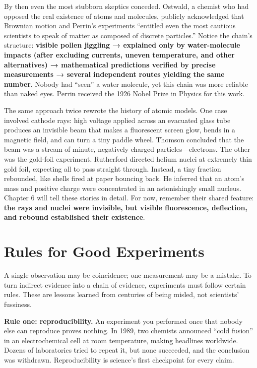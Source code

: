 \begin{zhengju}
By then even the most stubborn skeptics conceded. Ostwald, a chemist who had opposed the real existence of atoms and molecules, publicly acknowledged that Brownian motion and Perrin's experiments ``entitled even the most cautious scientists to speak of matter as composed of discrete particles.'' Notice the chain's structure: \textbf{visible pollen jiggling → explained only by water-molecule impacts (after excluding currents, uneven temperature, and other alternatives) → mathematical predictions verified by precise measurements → several independent routes yielding the same number}. Nobody had ``seen'' a water molecule, yet this chain was more reliable than naked eyes. Perrin received the 1926 Nobel Prize in Physics for this work.
\end{zhengju}

The same approach twice rewrote the history of atomic models. One case involved cathode rays: high voltage applied across an evacuated glass tube produces an invisible beam that makes a fluorescent screen glow, bends in a magnetic field, and can turn a tiny paddle wheel. Thomson concluded that the beam was a stream of minute, negatively charged particles---electrons. The other was the gold-foil experiment. Rutherford directed helium nuclei at extremely thin gold foil, expecting all to pass straight through. Instead, a tiny fraction rebounded, like shells fired at paper bouncing back. He inferred that an atom's mass and positive charge were concentrated in an astonishingly small nucleus. Chapter 6 will tell these stories in detail. For now, remember their shared feature: \textbf{the rays and nuclei were invisible, but visible fluorescence, deflection, and rebound established their existence}.

\section{Rules for Good Experiments}

A single observation may be coincidence; one measurement may be a mistake. To turn indirect evidence into a chain of evidence, experiments must follow certain rules. These are lessons learned from centuries of being misled, not scientists' fussiness.

\textbf{Rule one: reproducibility.} An experiment you performed once that nobody else can reproduce proves nothing. In 1989, two chemists announced ``cold fusion'' in an electrochemical cell at room temperature, making headlines worldwide. Dozens of laboratories tried to repeat it, but none succeeded, and the conclusion was withdrawn. Reproducibility is science's first checkpoint for every claim.

